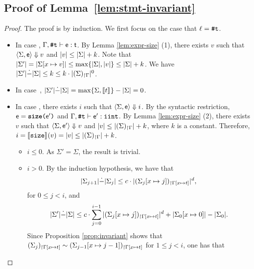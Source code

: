 \documentclass[runningheads]{llncs}
\begin{document}
\subsection{Proof of Lemma~\ref{lem:stmt-invariant}}\label{App_proof_of_lemma:stmt-invariant}

\begin{proof}
The proof is by induction.
We first focus on the case that $\ell=\texttt{\#}\mathtt{t}$.
\begin{itemize}
    \item In case , $\Gamma,\texttt{\#}\mathtt{t}\vdash\mathsf{e}:\mathsf{t}$. By Lemma \ref{lem:expr-size} (1), there exists $v$ such that $\langle\Sigma,\mathsf{e}\rangle\Downarrow{v}$ and $\vert v\vert\le\vert\Sigma\vert+k$.
    Note that $\vert\Sigma'\vert=\vert\Sigma[x\mapsto v]\vert \le \max\{\vert\Sigma\vert,\vert v\vert\} \le \vert\Sigma\vert + k$.
    We have $\vert\Sigma'\vert\dot{-}\vert\Sigma\vert\le k \le k \cdot \vert{(\Sigma)_{\restriction \Gamma}}\vert^0$.
    \item In case~, $\vert\Sigma'\vert\dot{-}\vert\Sigma\vert=\max\{\Sigma,\llbracket t\rrbracket_{}\}-\vert\Sigma\vert=0$.
    \item In case , there exists $i$ such that $\langle\Sigma,\mathsf{e}\rangle\Downarrow{i}$.
    By the syntactic restriction, $\mathsf{e}=\texttt{\textbf{size}($\mathsf{e}'$)}$ and $\Gamma,\texttt{\#}\mathtt{t}\vdash\mathsf{e}':\mathtt{iint}$.
        By Lemma \ref{lem:expr-size} (2), there exists $v$ such that $\langle\Sigma,\mathsf{e}'\rangle\Downarrow{v}$ and $\vert v\vert\le\vert{(\Sigma)_{\restriction \Gamma}}\vert+k$, where $k$ is a constant. Therefore, $i=\llbracket\mathtt{size}\rrbracket_{}(v)=\vert v\vert\le\vert{(\Sigma)_{\restriction \Gamma}}\vert+k$.
    \begin{itemize}
        \item $i\le0$.
        As $\Sigma'=\Sigma$, the result is trivial.
        \item $i>0$.
        By the induction hypothesis, we have that 
        \begin{equation}
            \vert\Sigma_{j+1}\vert\dot{-}\vert\Sigma_j\vert\le c \cdot \vert{(\Sigma_j[x\mapsto j])_{\restriction \Gamma[x\mapsto t]}}\vert^{d},
        \end{equation}
        for $0\le j<i$, and
        \begin{equation}
            \vert\Sigma'\vert\dot{-}\vert\Sigma\vert \le c\cdot\sum_{j=0}^{i-1}\vert{(\Sigma_j[x\mapsto j])_{\restriction \Gamma[x\mapsto t]}}\vert^{d}+\vert\Sigma_0[x\mapsto0]\vert-\vert\Sigma_0\vert.
        \end{equation}
        Since Proposition \ref{prop:invariant} shows that ${(\Sigma_j)_{\restriction \Gamma[x\mapsto t]}}\sim{(\Sigma_{j-1}[x\mapsto j-1])_{\restriction \Gamma[x\mapsto t]}}$ for $1\le j<i$, one has that

\end{itemize}
\end{itemize}
\end{proof}
\end{document}
